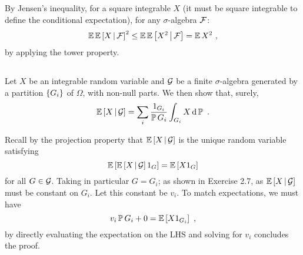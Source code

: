 \documentclass{article}
\begin{document}
        \subsection{}

        
        By Jensen's inequality, for a square integrable \(X\) (it must be square integrable to define the conditional expectation), for any \(\sigma\)-algebra \(\mathcal{F}\):
        \[
          \operatorname{\mathbb{E}}\operatorname{\mathbb{E}}\left[ X \,\middle|\, \mathcal{F} \right]^2\le \operatorname{\mathbb{E}}\operatorname{\mathbb{E}}\left[ X^2 \,\middle|\, \mathcal{F} \right]=\operatorname{\mathbb{E}} X^2\,\,,
        \]
        by applying the tower property.

        \subsection{}

        Let \(X\) be an integrable random variable and \(\mathcal{G}\) be a finite \(\sigma\)-algebra generated by a partition \(\left\{{G_i}\right\}\) of \(\Omega\), with non-null parts. We then show that, surely,
        \[
          \operatorname{\mathbb{E}}\left[ X \,\middle|\, \mathcal{G} \right]=\sum_i\frac{1_{G_i}}{\operatorname{\mathbb{P}} G_i}\int_{G_i}X\mathop{\mathrm{d} \operatorname{\mathbb{P}} }\,\,.
        \]

        Recall by the projection property that \(\operatorname{\mathbb{E}}\left[ X \,\middle|\, \mathcal{G} \right]\) is the unique random variable satisfying
        \[
          \operatorname{\mathbb{E}}\left[{\operatorname{\mathbb{E}}\left[ X \,\middle|\, \mathcal{G} \right]1_G}\right]=\operatorname{\mathbb{E}}\left[{X1_G}\right]
        \]
        for all \(G\in \mathcal{G}\). Taking in particular \(G=G_i\); as shown in Exercise 2.7, as \(\operatorname{\mathbb{E}}\left[ X \,\middle|\, \mathcal{G} \right]\) must be constant on \(G_i\). Let this constant be \(v_i\). To match expectations, we must have
        \[
          v_i\operatorname{\mathbb{P}} G_i+0=\operatorname{\mathbb{E}}\left[{X1_{G_i}}\right]\,\,,
        \]
        by directly evaluating the expectation on the LHS and solving for \(v_i\) concludes the proof.
        
\end{document}
